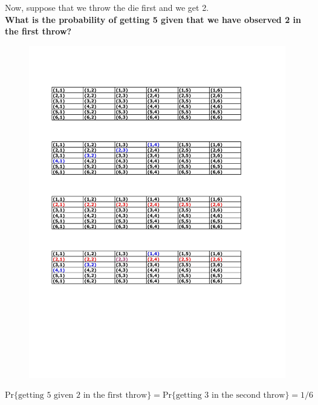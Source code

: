 \documentclass[notes=show,handout]{beamer}\usepackage[]{graphicx}\usepackage[]{color}
\begin{document}
\begin{frame}{\secname}
  \begin{example}[cont'd]
  Now, suppose that we throw the die first and we get 2.\\
  \vspace{0.2cm}
  \textbf{What is the probability of getting 5 given that we have observed 2 in the first throw?}
  \begin{figure}[h!]
  \centering
  \includegraphics[scale=0.7]{img/c4.pdf}
  \end{figure}
  \begin{footnotesize}
  $\text{Pr}\{\text{getting 5 given 2 in the first throw}\}= \text{Pr}\{\text{getting 3 in the second throw}\}=1/6$
  \end{footnotesize}
  \end{example}
\end{frame}
\end{document}
